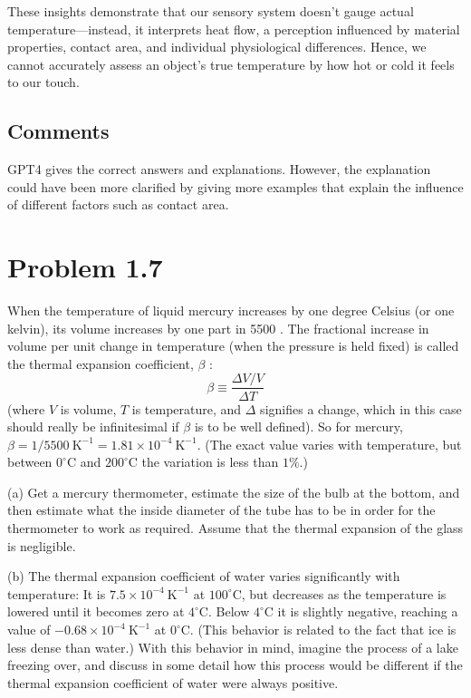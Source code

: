 \documentclass[12pt]{article}
\begin{document}
These insights demonstrate that our sensory system doesn't gauge actual temperature—instead, it interprets heat flow, a perception influenced by material properties, contact area, and individual physiological differences. Hence, we cannot accurately assess an object's true temperature by how hot or cold it feels to our touch.

\subsection*{Comments}

GPT4 gives the correct answers and explanations. However, the explanation could have been more clarified by giving more examples that explain the influence of different factors such as contact area. 

\section*{Problem 1.7}

When the temperature of liquid mercury increases by one degree Celsius (or one kelvin), its volume increases by one part in 5500 . The fractional increase in volume per unit change in temperature (when the pressure is held fixed) is called the thermal expansion coefficient, $\beta$ :
$$
\beta \equiv \frac{\Delta V / V}{\Delta T}
$$
(where $V$ is volume, $T$ is temperature, and $\Delta$ signifies a change, which in this case should really be infinitesimal if $\beta$ is to be well defined). So for mercury, $\beta=1 / 5500 \mathrm{~K}^{-1}=1.81 \times 10^{-4} \mathrm{~K}^{-1}$. (The exact value varies with temperature, but between $0^{\circ} \mathrm{C}$ and $200^{\circ} \mathrm{C}$ the variation is less than $1 \%$.)

(a) Get a mercury thermometer, estimate the size of the bulb at the bottom, and then estimate what the inside diameter of the tube has to be in order for the thermometer to work as required. Assume that the thermal expansion of the glass is negligible.

(b) The thermal expansion coefficient of water varies significantly with temperature: It is $7.5 \times 10^{-4} \mathrm{~K}^{-1}$ at $100^{\circ} \mathrm{C}$, but decreases as the temperature is lowered until it becomes zero at $4^{\circ} \mathrm{C}$. Below $4^{\circ} \mathrm{C}$ it is slightly negative, reaching a value of $-0.68 \times 10^{-4} \mathrm{~K}^{-1}$ at $0^{\circ} \mathrm{C}$. (This behavior is related to the fact that ice is less dense than water.) With this behavior in mind, imagine the process of a lake freezing over, and discuss in some detail how this process would be different if the thermal expansion coefficient of water were always positive.
\end{document}
